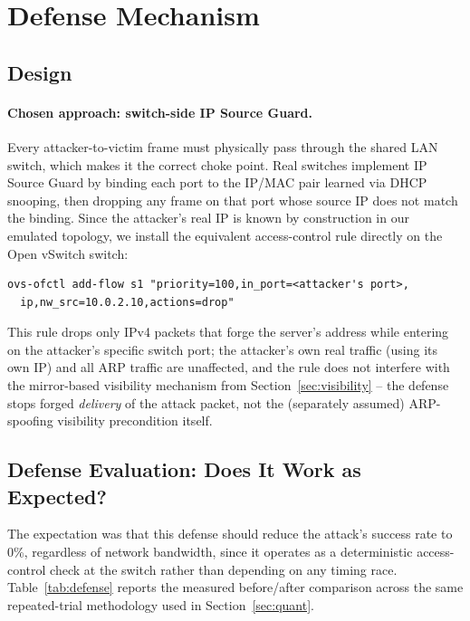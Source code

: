 \documentclass[11pt]{article}
\begin{document}
\section{Defense Mechanism}
\label{sec:defense}

\subsection{Design}

\paragraph{Chosen approach: switch-side IP Source Guard.} Every
attacker-to-victim frame must physically pass through the shared LAN
switch, which makes it the correct choke point. Real switches implement
IP Source Guard by binding each port to the IP/MAC pair learned via DHCP
snooping, then dropping any frame on that port whose source IP does not
match the binding. Since the attacker's real IP is known by construction
in our emulated topology, we install the equivalent access-control rule
directly on the Open vSwitch switch:
\begin{lstlisting}
ovs-ofctl add-flow s1 "priority=100,in_port=<attacker's port>,
  ip,nw_src=10.0.2.10,actions=drop"
\end{lstlisting}
This rule drops only IPv4 packets that forge the server's address while
entering on the attacker's specific switch port; the attacker's own real
traffic (using its own IP) and all ARP traffic are unaffected, and the
rule does not interfere with the mirror-based visibility mechanism from
Section~\ref{sec:visibility} -- the defense stops forged \emph{delivery}
of the attack packet, not the (separately assumed) ARP-spoofing
visibility precondition itself.

\subsection{Defense Evaluation: Does It Work as Expected?}

The expectation was that this defense should reduce the attack's success
rate to 0\%, regardless of network bandwidth, since it operates as a
deterministic access-control check at the switch rather than depending
on any timing race. Table~\ref{tab:defense} reports the measured
before/after comparison across the same repeated-trial methodology used
in Section~\ref{sec:quant}.
\end{document}
